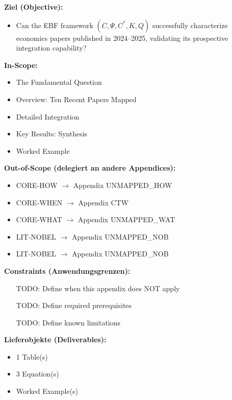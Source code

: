 \begin{tcolorbox}[
    colback=orange!5!white,
    colframe=orange!75!black,
    title={\textbf{Appendix Scope: Ziel / In-Scope / Out-of-Scope / Constraints}},
    fonttitle=\bfseries
]

\textbf{Ziel (Objective):}
\begin{itemize}[nosep]
    \item Can the EBF framework $(C, \Psi, C^*, K, Q)$ successfully characterize
economics papers published in 2024--2025, validating its prospective
integration capability?
\end{itemize}

\textbf{In-Scope:}
\begin{itemize}[nosep]
    \item The Fundamental Question
    \item Overview: Ten Recent Papers Mapped
    \item Detailed Integration
    \item Key Results: Synthesis
    \item Worked Example
\end{itemize}

\textbf{Out-of-Scope (delegiert an andere Appendices):}
\begin{itemize}[nosep]
    \item CORE-HOW $\rightarrow$ Appendix UNMAPPED_HOW
    \item CORE-WHEN $\rightarrow$ Appendix CTW
    \item CORE-WHAT $\rightarrow$ Appendix UNMAPPED_WAT
    \item LIT-NOBEL $\rightarrow$ Appendix UNMAPPED_NOB
    \item LIT-NOBEL $\rightarrow$ Appendix UNMAPPED_NOB
\end{itemize}

\textbf{Constraints (Anwendungsgrenzen):}
\begin{itemize}[nosep]
    \item [TODO: Define when this appendix does NOT apply]
    \item [TODO: Define required prerequisites]
    \item [TODO: Define known limitations]
\end{itemize}

\textbf{Lieferobjekte (Deliverables):}
\begin{itemize}[nosep]
    \item 1 Table(s)
    \item 3 Equation(s)
    \item Worked Example(s)
\end{itemize}

\end{tcolorbox}


